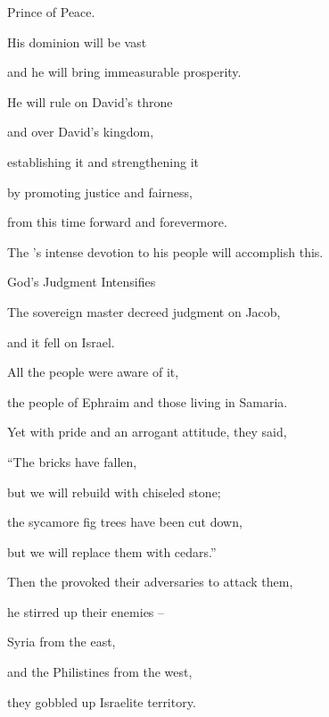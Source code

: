 {\par }{\Q Prince
of Peace.
\par }{\Q {}His dominion
will be vast
\par }{\Q and he will bring immeasurable
prosperity.
\par }{\Q He will rule on
David’s
throne
\par }{\Q and over
David’s kingdom,
\par }{\Q establishing
it and strengthening
it
\par }{\Q by promoting justice
and fairness,
\par }{\Q from this time
forward and forevermore.
\par }{\Q The
{}’s
intense
devotion
to his people will accomplish
this.
\par }{\SH God’s Judgment Intensifies
\par }{\Q {}The sovereign
master
decreed judgment on Jacob,
\par }{\Q and it fell
on Israel.
\par }{\Q {}All
the people were aware
of it,
\par }{\Q the people
of Ephraim
and those living in
Samaria.
\par }{\Q Yet with pride
and an arrogant
attitude,
they said,
\par }{\Q {}“The bricks
have fallen,
\par }{\Q but we will rebuild
with chiseled
stone;
\par }{\Q the sycamore fig trees
have been cut down,
\par }{\Q but we will replace
them with cedars.”
\par }{\Q {}Then the
{}
provoked
their adversaries
to attack them,

\par }{\Q he stirred up their enemies –
\par }{\Q {}Syria
from the east,
\par }{\Q and the Philistines
from the west,
\par }{\Q they gobbled up
Israelite
territory.

}
